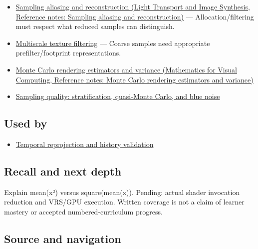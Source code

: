 \hypertarget{appendix-4192b2bdd21e-prerequisites}{}

\begin{itemize}
\tightlist
\item
  \href{../04-Light-Transport-and-Image-Synthesis/main.pdf\#nameddest=appendix-6a7869dd79a6}{Sampling aliasing and reconstruction (Light Transport and Image Synthesis, Reference notes: Sampling aliasing and reconstruction)} --- Allocation/filtering must respect what reduced samples can distinguish.
\item
  \hyperref[appendix-b677a85ba76f]{Multiscale texture filtering} --- Coarse samples need appropriate prefilter/footprint representations.
\item
  \href{../02-Mathematics-for-Visual-Computing/main.pdf\#nameddest=appendix-031e02bf28af}{Monte Carlo rendering estimators and variance (Mathematics for Visual Computing, Reference notes: Monte Carlo rendering estimators and variance)}
\item
  \hyperref[appendix-9f693ffd82bc]{Sampling quality: stratification, quasi-Monte Carlo, and blue noise}
\end{itemize}

\subsection{Used by}\label{appendix-4192b2bdd21e-used-by}

\hypertarget{appendix-4192b2bdd21e-used-by}{}

\begin{itemize}
\tightlist
\item
  \hyperref[appendix-0727340a4428]{Temporal reprojection and history validation}
\end{itemize}

\subsection{Recall and next depth}\label{appendix-4192b2bdd21e-recall-and-next-depth}

\hypertarget{appendix-4192b2bdd21e-recall-and-next-depth}{}

Explain mean(x²) versus square(mean(x)). Pending: actual shader invocation reduction and VRS/GPU execution. Written coverage is not a claim of learner mastery or accepted numbered-curriculum progress.

\subsection{Source and navigation}\label{appendix-4192b2bdd21e-source-and-navigation}

